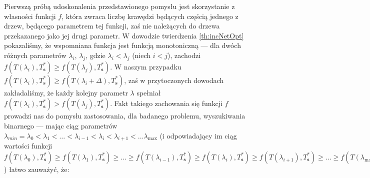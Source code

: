 Pierwszą próbą udoskonalenia przedstawionego pomysłu jest skorzystanie z własności funkcji $f$, która zwraca liczbę krawędzi będących częścią jednego z drzew, będącego parametrem tej funkcji, zaś nie należących do drzewa przekazanego jako jej drugi parametr. W dowodzie twierdzenia \ref{th:incNetOpt} pokazaliśmy, że wspomniana funkcja jest funkcją monotoniczną --- dla dwóch różnych parametrów $\lambda_{i}$, $\lambda_{j}$, gdzie $\lambda_{i} < \lambda_{j}$ (niech $i < j$), zachodzi $f \left( T \left( \lambda_{i} \right), T^{\ast}_{\textbf{s}} \right) \geqslant f \left( T \left( \lambda_{j} \right), T^{\ast}_{\textbf{s}} \right)$. W naszym przypadku $f \left( T \left( \lambda_{i} \right), T^{\ast}_{\textbf{s}} \right) \geqslant f \left( T \left( \lambda_{i} + \Delta \right), T^{\ast}_{\textbf{s}} \right)$, zaś w przytoczonych dowodach zakładaliśmy, że każdy kolejny parametr $\lambda$ spełniał $f \left( T \left( \lambda_{i} \right), T^{\ast}_{\textbf{s}} \right) > f \left( T \left( \lambda_{j} \right), T^{\ast}_{\textbf{s}} \right)$. Fakt takiego zachowania się funkcji $f$ prowadzi nas do pomysłu zastosowania, dla badanego problemu, wyszukiwania binarnego --- mając ciąg parametrów $\lambda_{min} = \lambda_{0} < \lambda_{1} < \dots < \lambda_{i-1} < \lambda_{i} < \lambda_{i+1} < \dots \lambda_{\text{max}}$ (i odpowiadający im ciąg wartości funkcji $f \left( T \left( \lambda_{0} \right), T^{\ast}_{\textbf{s}} \right) \geqslant f \left( T \left( \lambda_{1} \right), T^{\ast}_{\textbf{s}} \right) \geqslant \dots \geqslant f \left( T \left( \lambda_{i-1} \right), T^{\ast}_{\textbf{s}} \right) \geqslant f \left( T \left( \lambda_{i} \right), T^{\ast}_{\textbf{s}} \right) \geqslant f \left( T \left( \lambda_{i+1} \right), T^{\ast}_{\textbf{s}} \right) \geqslant \dots \geqslant f \left( T \left( \lambda_{\text{max}} \right), T^{\ast}_{\textbf{s}} \right)$) łatwo zauważyć, że:

